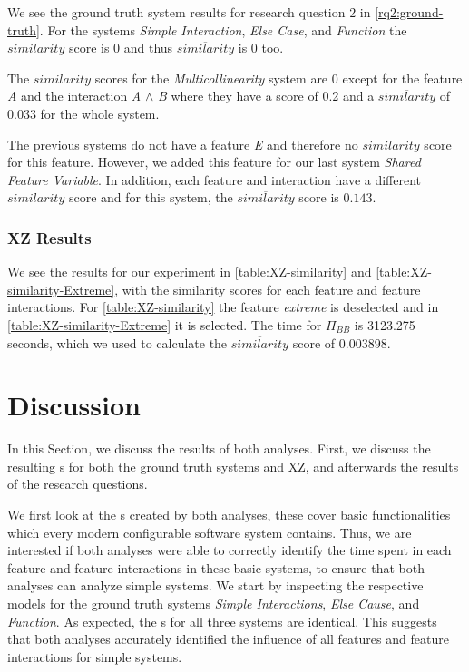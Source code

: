 We see the ground truth system results for research question 2 in \autoref{rq2:ground-truth}.  
For the systems \emph{Simple Interaction}, \emph{Else Case}, and \emph{Function} the $similarity$ score is $0$ and thus 
$\overline{similarity}$ is $0$ too. 

The $similarity$ scores for the \emph{Multicollinearity} system are $0$ except for the feature \emph{A} and the interaction
\emph{A} $\land$ \emph{B} where they have a score of 0.2 and a $\overline{similarity}$ of $0.033$
for the whole system.

The previous systems do not have a feature \emph{E} and therefore no $similarity$ score for this feature. 
However, we added this feature for our last system \emph{Shared Feature Variable}. 
In addition, each feature and interaction have a different $similarity$ score and for this system, 
the $\overline{similarity}$ score is $0.143$.

\subsubsection*{XZ Results}

We see the results for our experiment in \autoref{table:XZ-similarity} and \autoref{table:XZ-similarity-Extreme}, with the similarity scores for each feature and feature interactions.
For \autoref{table:XZ-similarity} the feature \emph{extreme} is deselected and in \autoref{table:XZ-similarity-Extreme} it is selected.
The time for $\Pi_{BB}$ is 3123.275 seconds, which we used to calculate the $\overline{similarity}$ score of $0.003898$. 


\section{Discussion}\label{sec:discussion}

In this Section, we discuss the results of both analyses. First, we discuss the resulting {\perfInfluenceModel}s 
for both the ground truth systems and \textsc{XZ}, and afterwards the results of the research questions.

We first look at the {\perfInfluenceModel}s created by both analyses, these cover basic functionalities which every modern 
configurable software system contains. 
Thus, we are interested if both analyses were able to correctly identify the time spent in each feature and feature interactions in these basic systems,
to ensure that both analyses can analyze simple systems.
We start by inspecting the respective models for the ground truth systems \emph{Simple Interactions},
\emph{Else Cause}, and \emph{Function}. As expected, the {\perfInfluenceModel}s for all three systems are identical.
This suggests that both analyses accurately identified the influence of all features and feature interactions for simple systems.


